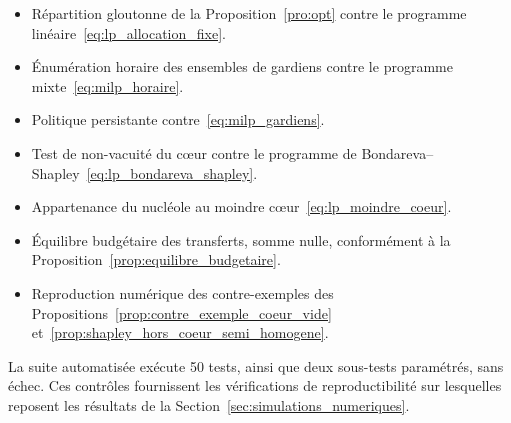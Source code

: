 \begin{itemize}
    \item Répartition gloutonne de la Proposition~\ref{pro:opt} contre le
    programme linéaire~\eqref{eq:lp_allocation_fixe}.
    \item Énumération horaire des ensembles de gardiens contre le programme
    mixte~\eqref{eq:milp_horaire}.
    \item Politique persistante contre~\eqref{eq:milp_gardiens}.
    \item Test de non-vacuité du cœur contre le programme de
    Bondareva--Shapley~\eqref{eq:lp_bondareva_shapley}.
    \item Appartenance du nucléole au moindre
    cœur~\eqref{eq:lp_moindre_coeur}.
    \item Équilibre budgétaire des transferts, somme nulle, conformément à la
    Proposition~\ref{prop:equilibre_budgetaire}.
    \item Reproduction numérique des contre-exemples des
    Propositions~\ref{prop:contre_exemple_coeur_vide}
    et~\ref{prop:shapley_hors_coeur_semi_homogene}.
\end{itemize}

La suite automatisée exécute 50 tests, ainsi que deux sous-tests paramétrés,
sans échec. Ces contrôles fournissent les vérifications de reproductibilité
sur lesquelles reposent les résultats de la
Section~\ref{sec:simulations_numeriques}.
